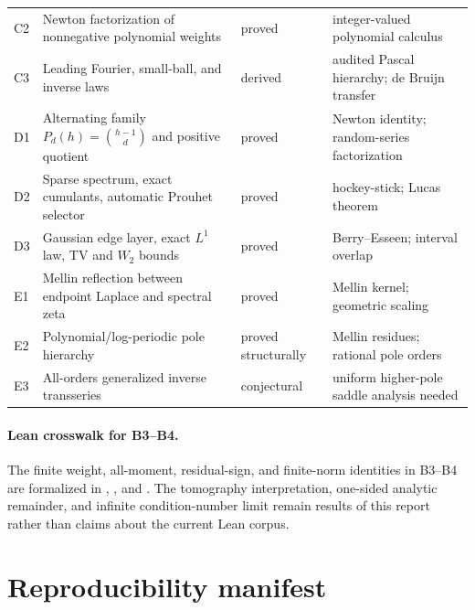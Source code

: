\documentclass[11pt,oneside]{article}
\numberwithin{equation}{section}
\theoremstyle{definition}
\theoremstyle{remark}
\begin{document}
\begin{longtable}{@{}>{\raggedright\arraybackslash}p{}>{\raggedright\arraybackslash}p{}>{\raggedright\arraybackslash}p{}>{\raggedright\arraybackslash}p{}@{}}
C2 & Newton factorization of nonnegative polynomial weights & proved & integer-valued polynomial calculus\\
C3 & Leading Fourier, small-ball, and inverse laws & derived & audited Pascal hierarchy; de Bruijn transfer\\
D1 & Alternating family $P_d(h)=\binom{h-1}{d}$ and positive quotient & proved & Newton identity; random-series factorization\\
D2 & Sparse spectrum, exact cumulants, automatic Prouhet selector & proved & hockey-stick; Lucas theorem\\
D3 & Gaussian edge layer, exact $L^1$ law, TV and $W_2$ bounds & proved & Berry--Esseen; interval overlap\\
E1 & Mellin reflection between endpoint Laplace and spectral zeta & proved & Mellin kernel; geometric scaling\\
E2 & Polynomial/log-periodic pole hierarchy & proved structurally & Mellin residues; rational pole orders\\
E3 & All-orders generalized inverse transseries & conjectural & uniform higher-pole saddle analysis needed\\
\bottomrule
\end{longtable}

\paragraph{Lean crosswalk for B3--B4.}
The finite weight, all-moment, residual-sign, and finite-norm identities in
B3--B4 are formalized in ,
, and
.  The tomography interpretation,
one-sided analytic remainder, and infinite condition-number limit remain
results of this report rather than claims about the current Lean corpus.

\section{Reproducibility manifest}
\label{app:manifest}
\end{document}
